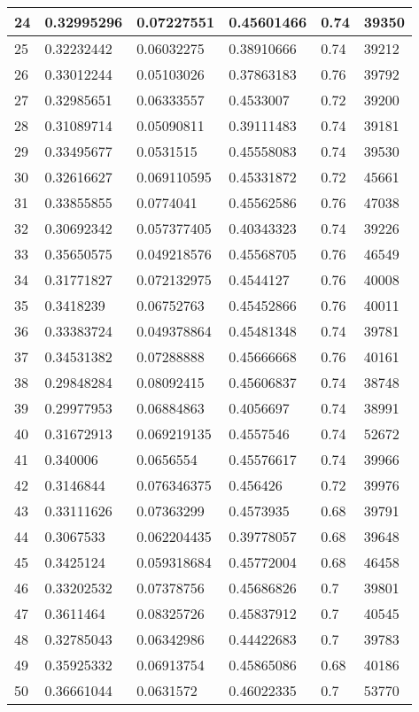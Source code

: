 \begin{longtable}{|l|l|l|l|l|l|}
24 & 0.32995296 & 0.07227551 & 0.45601466 & 0.74 & 39350 \\ \hline 
25 & 0.32232442 & 0.06032275 & 0.38910666 & 0.74 & 39212 \\ \hline 
26 & 0.33012244 & 0.05103026 & 0.37863183 & 0.76 & 39792 \\ \hline 
27 & 0.32985651 & 0.06333557 & 0.4533007 & 0.72 & 39200 \\ \hline 
28 & 0.31089714 & 0.05090811 & 0.39111483 & 0.74 & 39181 \\ \hline 
29 & 0.33495677 & 0.0531515 & 0.45558083 & 0.74 & 39530 \\ \hline 
30 & 0.32616627 & 0.069110595 & 0.45331872 & 0.72 & 45661 \\ \hline 
31 & 0.33855855 & 0.0774041 & 0.45562586 & 0.76 & 47038 \\ \hline 
32 & 0.30692342 & 0.057377405 & 0.40343323 & 0.74 & 39226 \\ \hline 
33 & 0.35650575 & 0.049218576 & 0.45568705 & 0.76 & 46549 \\ \hline 
34 & 0.31771827 & 0.072132975 & 0.4544127 & 0.76 & 40008 \\ \hline 
35 & 0.3418239 & 0.06752763 & 0.45452866 & 0.76 & 40011 \\ \hline 
36 & 0.33383724 & 0.049378864 & 0.45481348 & 0.74 & 39781 \\ \hline 
37 & 0.34531382 & 0.07288888 & 0.45666668 & 0.76 & 40161 \\ \hline 
38 & 0.29848284 & 0.08092415 & 0.45606837 & 0.74 & 38748 \\ \hline 
39 & 0.29977953 & 0.06884863 & 0.4056697 & 0.74 & 38991 \\ \hline 
40 & 0.31672913 & 0.069219135 & 0.4557546 & 0.74 & 52672 \\ \hline 
41 & 0.340006 & 0.0656554 & 0.45576617 & 0.74 & 39966 \\ \hline 
42 & 0.3146844 & 0.076346375 & 0.456426 & 0.72 & 39976 \\ \hline 
43 & 0.33111626 & 0.07363299 & 0.4573935 & 0.68 & 39791 \\ \hline 
44 & 0.3067533 & 0.062204435 & 0.39778057 & 0.68 & 39648 \\ \hline 
45 & 0.3425124 & 0.059318684 & 0.45772004 & 0.68 & 46458 \\ \hline 
46 & 0.33202532 & 0.07378756 & 0.45686826 & 0.7 & 39801 \\ \hline 
47 & 0.3611464 & 0.08325726 & 0.45837912 & 0.7 & 40545 \\ \hline 
48 & 0.32785043 & 0.06342986 & 0.44422683 & 0.7 & 39783 \\ \hline 
49 & 0.35925332 & 0.06913754 & 0.45865086 & 0.68 & 40186 \\ \hline 
50 & 0.36661044 & 0.0631572 & 0.46022335 & 0.7 & 53770 \\ \hline 
\end{longtable}